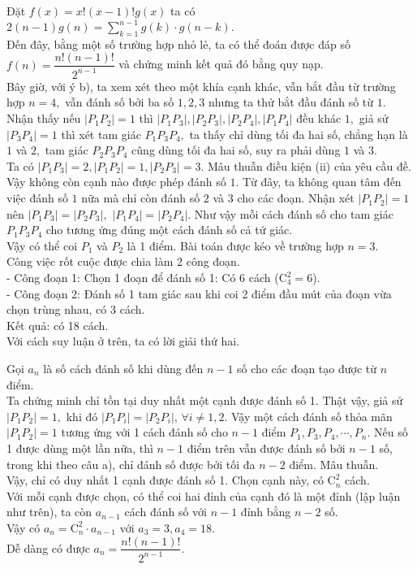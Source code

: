 \begin{bt}
{\begin{enumerate}
			Đặt $f(x)=x!(x-1)!g(x)$ ta có $2(n-1)g(n)=\sum\limits_{k=1}^{n-1} g(k)\cdot g(n-k).$\\
			Đến đây, bằng một số trường hợp nhỏ lẻ, ta có thể đoán được đáp số 
			$f(n)=\dfrac{n!(n-1)!}{2^{n-1}}$ và chứng minh kết quả đó bằng quy nạp.\\
			Bây giờ, với ý b), ta xem xét theo một khía cạnh khác, vẫn bắt đầu từ trường hợp $n=4,$ vẫn đánh số bởi ba số $1,2,3$ nhưng ta thử bắt đầu đánh số từ $1.$ 
			Nhận thấy nếu $|P_1P_2|=1$ thì $|P_1P_3|, |P_2P_3|, |P_2P_4|, |P_1P_4|$ đều khác $1,$ giả sử $|P_3P_4|=1$ thì xét tam giác $P_1P_3P_4,$ ta thấy chỉ dùng tối đa hai số, chẳng hạn là $1$ và $2,$ tam giác $P_2P_3P_4$ cũng dùng tối đa hai số, suy ra phải dùng $1$ và $3.$\\ Ta có $|P_1P_3|=2, |P_1P_2|=1, |P_2P_3|=3.$ Mâu thuẫn điều kiện (ii) của yêu cầu đề.\\
			Vậy không còn cạnh nào được phép đánh số $1.$ Từ đây, ta không quan tâm đến việc đánh số $1$ nữa mà chỉ còn đánh số $2$ và $3$ cho các đoạn. Nhận xét $|P_1P_2|=1$ nên $|P_1P_3|=|P_2P_3|,$ $|P_1P_4|=|P_2P_4|.$ Như vậy mỗi cách đánh số cho tam giác $P_1P_3P_4$ cho tương ứng đúng một cách đánh số cả tứ giác.\\ Vậy có thể coi $P_1$ và $P_2$ là 1 điểm. Bài toán được kéo về trường hợp $n=3.$\\ 
			Công việc rốt cuộc được chia làm 2 công đoạn.\\
			-  Công đoạn 1: Chọn 1 đoạn để đánh số 1: Có 6 cách ($\mathrm{C}_4^2=6$).\\
			- Công đoạn 2:  Đánh số 1 tam giác sau khi coi 2 điểm đầu mút của đoạn vừa chọn trùng nhau, có 3 cách.\\
			Kết quả: có 18 cách.\\
			Với cách suy luận ở trên, ta có lời giải thứ hai.
			
			Gọi $a_n$ là số cách đánh số khi dùng đến $n-1$ số cho các đoạn tạo được từ $n$ điểm.\\
			Ta chứng minh chỉ tồn tại duy nhất một cạnh được đánh số 1. Thật vậy, giả sử $|P_1P_2|=1,$ khi đó $|P_1P_i|=|P_2P_i|,\, \forall i\ne 1,2.$  Vậy một cách đánh số thỏa mãn $|P_1P_2|=1$ tương ứng với 1 cách đánh số cho $n-1$ điểm $P_1, P_3, P_4,\cdots, P_n.$ Nếu số 1 được dùng một lần nữa, thì $n-1$ điểm trên vẫn được đánh số bởi $n-1$ số, trong khi theo câu a), chỉ đánh số được bởi tối đa $n-2$ điểm. Mâu thuẫn.\\ 
			Vậy, chỉ có duy nhất 1 cạnh được đánh số 1. Chọn cạnh này, có $\mathrm{C}_n^2$ cách.\\
			Với mỗi cạnh được chọn, có thể coi hai đỉnh của cạnh đó là một đỉnh (lập luận như trên), ta còn $a_{n-1}$ cách đánh số với $n-1$ đỉnh bằng $n-2$ số.\\ 
			Vậy có $a_n=\mathrm{C}_n^2\cdot a_{n-1}$ với $a_3=3, a_4=18.$\\ 
			Dễ dàng có được $a_n=\dfrac{n!(n-1)!}{2^{n-1}}.$	
		\end{enumerate}
	}
\end{bt}
